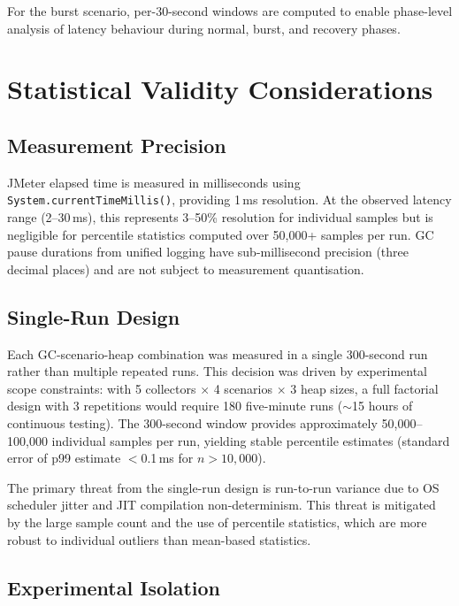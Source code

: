 For the burst scenario, per-30-second windows are computed to enable phase-level analysis of latency behaviour during normal, burst, and recovery phases.

\section{Statistical Validity Considerations}
\label{sec:statistical}

\subsection{Measurement Precision}
\label{subsec:precision}

JMeter elapsed time is measured in milliseconds using \texttt{System.currentTimeMillis()}, providing 1\,ms resolution. At the observed latency range (2--30\,ms), this represents 3--50\% resolution for individual samples but is negligible for percentile statistics computed over 50,000+ samples per run. GC pause durations from unified logging have sub-millisecond precision (three decimal places) and are not subject to measurement quantisation.

\subsection{Single-Run Design}
\label{subsec:single-run}

Each GC-scenario-heap combination was measured in a single 300-second run rather than multiple repeated runs. This decision was driven by experimental scope constraints: with 5 collectors $\times$ 4 scenarios $\times$ 3 heap sizes, a full factorial design with 3 repetitions would require 180 five-minute runs ($\sim$15 hours of continuous testing). The 300-second window provides approximately 50,000--100,000 individual samples per run, yielding stable percentile estimates (standard error of p99 estimate $<$0.1\,ms for $n > 10,000$).

The primary threat from the single-run design is run-to-run variance due to OS scheduler jitter and JIT compilation non-determinism. This threat is mitigated by the large sample count and the use of percentile statistics, which are more robust to individual outliers than mean-based statistics.

\subsection{Experimental Isolation}
\label{subsec:isolation}

